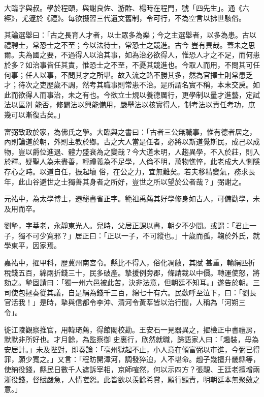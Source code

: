 \begin{pinyinscope}
 大臨字與叔。學於程頤，與謝良佐、游酢、楊時在程門，號「四先生」。通《六經》，尤邃於《禮》。每欲掇習三代遺文舊制，令可行，不為空言以拂世駭俗。



 其論選舉曰：「古之長育人才者，以士眾多為樂；今之主選舉者，以多為患。古以禮聘士，常恐士之不至；今以法待士，常恐士之競進。古今
 豈有異哉。蓋未之思爾。夫為國之要，不過得人以治其事，如為治必欲得人，惟恐人才之不足，而何患於多？如治事皆任其責，惟恐士之不至，不憂其競進也。今取人而用，不問其可任何事；任人以事，不問其才之所堪。故入流之路不勝其多，然為官擇士則常患乏才；待次之吏歷歲不調，然考其職事則常患不治。是所謂名實不稱，本末交戾。如此而欲得人而事治，未之有也。今欲立士規以養德厲行，更學制以量才進藝，定試法以區別
 能否，修闢法以興能備用，嚴舉法以核實得人，制考法以責任考功，庶幾可以漸復古矣。」



 富弼致政於家，為佛氏之學。大臨與之書曰：「古者三公無職事，惟有德者居之，內則論道於朝，外則主教於鄉。古之大人當是任者，必將以斯道覺斯民，成己以成物，豈以爵位進退、體力盛衰為之變哉？今大道未明，人趨異學，不入於莊，則入於釋。疑聖人為未盡善，輕禮義為不足學，人倫不明，萬物憔悴，此老成大人惻隱存心之時。以道自任，振起壞
 俗，在公之力，宜無難矣。若夫移精變氣，務求長年，此山谷避世之士獨善其身者之所好，豈世之所以望於公者哉？」弼謝之。



 元祐中，為太學博士，遷秘書省正字。範祖禹薦其好學修身如古人，可備勸學，未及用而卒。



 劉摯，字莘老，永靜東光人。兒時，父居正課以書，朝夕不少間。或謂：「君止一子，獨不可少寬邪？」居正曰：「正以一子，不可縱也。」十歲而孤，鞠於外氏，就學東平，因家焉。



 嘉祐中，擢甲科，歷冀州南宮令。縣比不得入，俗化凋敝，其賦
 甚重，輸絹匹折稅錢五百，綿兩折錢三十，民多破產。摯援例旁郡，條請裁以中價。轉運使怒，將劾之。摯固請曰：「獨一州六邑被此苦，決非法意，但朝廷不知耳。」遂告於朝。三司使包拯奏從其議，自是絹為錢千三百，綿七十有六。民歡呼至泣下，曰：「劉長官活我！」是時，摯與信都令李沖、清河令黃莘皆以治行聞，人稱為「河朔三令」。



 徙江陵觀察推官，用韓琦薦，得館閣校勘。王安石一見器異之，擢檢正中書禮房，默默非所好也。才月餘，為監察御
 史裏行，欣然就職，歸語家人曰：「趣裝，毋為安居計。」未及陛對，即奏論：「亳州獄起不止，小人意在傾富弼以市進，今弼已得罪，願少寬之。」又言：「程昉開漳河，調發猝迫，人不堪命。趙子幾擅升畿縣等，使納役錢，縣民日數千人遮訴宰相，京師喧然，何以示四方？張靚、王廷老擅增兩浙役錢，督賦嚴急，人情嗟怨。此皆欲以羨餘希賞，願行顯責，明朝廷本無聚斂之意。」




\end{pinyinscope}
